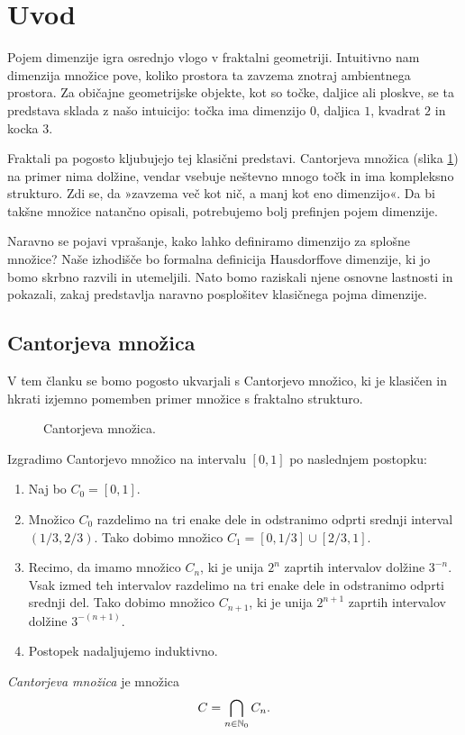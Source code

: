 \section{Uvod}
Pojem dimenzije igra osrednjo vlogo v fraktalni geometriji. Intuitivno nam dimenzija množice pove, koliko prostora ta zavzema znotraj ambientnega prostora. Za običajne geometrijske objekte, kot so točke, daljice ali ploskve, se ta predstava sklada z našo intuicijo: točka ima dimenzijo \(0\), daljica \(1\), kvadrat \(2\) in kocka \(3\).

Fraktali pa pogosto kljubujejo tej klasični predstavi. Cantorjeva množica (slika \ref{fig:cantor-set}) na primer nima dolžine, vendar vsebuje neštevno mnogo točk in ima kompleksno strukturo. Zdi se, da »zavzema več kot nič, a manj kot eno dimenzijo«. Da bi takšne množice natančno opisali, potrebujemo bolj prefinjen pojem dimenzije.

Naravno se pojavi vprašanje, kako lahko definiramo dimenzijo za splošne množice? Naše izhodišče bo formalna definicija Hausdorffove dimenzije, ki jo bomo skrbno razvili in utemeljili. Nato bomo raziskali njene osnovne lastnosti in pokazali, zakaj predstavlja naravno posplošitev klasičnega pojma dimenzije.

\subsection{Cantorjeva množica}
V tem članku se bomo pogosto ukvarjali s Cantorjevo množico, ki je klasičen in hkrati izjemno pomemben primer množice s fraktalno strukturo.

\begin{figure}[ht]
    \centering
    \caption{Cantorjeva množica.}
    \label{fig:cantor-set}
\end{figure}

Izgradimo Cantorjevo množico na intervalu \([0,1]\) po naslednjem postopku:
\begin{enumerate}
    \item Naj bo \(C_0 = [0,1]\).
    \item Množico \(C_0\) razdelimo na tri enake dele in odstranimo odprti srednji interval \((1/3, 2/3)\). Tako dobimo množico \(C_1 = [0, 1/3] \cup [2/3, 1]\).
    \item Recimo, da imamo množico \(C_n\), ki je unija \(2^n\) zaprtih intervalov dolžine \(3^{-n}\). Vsak izmed teh intervalov razdelimo na tri enake dele in odstranimo odprti srednji del. Tako dobimo množico \(C_{n+1}\), ki je unija \(2^{n+1}\) zaprtih intervalov dolžine \(3^{-(n+1)}\).
    \item Postopek nadaljujemo induktivno.
\end{enumerate}

\begin{definicija}
    \emph{Cantorjeva množica} je množica
    \[
        C = \bigcap_{n \in \mathbb{N}_0} C_n.
    \]
\end{definicija}